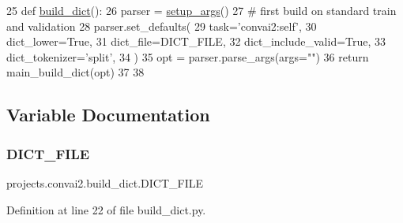 \begin{DoxyCode}
25 \textcolor{keyword}{def }\hyperlink{namespaceprojects_1_1convai2_1_1build__dict_a0e5fa5d8d2bd2bc934e287a49d2d60c7}{build\_dict}():
26     parser = \hyperlink{namespaceparlai_1_1scripts_1_1build__dict_a01e78707ace903aa772ada53fafe7067}{setup\_args}()
27     \textcolor{comment}{# first build on standard train and validation}
28     parser.set\_defaults(
29         task=\textcolor{stringliteral}{'convai2:self'},
30         dict\_lower=\textcolor{keyword}{True},
31         dict\_file=DICT\_FILE,
32         dict\_include\_valid=\textcolor{keyword}{True},
33         dict\_tokenizer=\textcolor{stringliteral}{'split'},
34     )
35     opt = parser.parse\_args(args=\textcolor{stringliteral}{""})
36     \textcolor{keywordflow}{return} main\_build\_dict(opt)
37 
38 
\end{DoxyCode}


\subsection{Variable Documentation}
\mbox{\label{namespaceprojects_1_1convai2_1_1build__dict_af45450500d405cd80212e1dbc72221e6}} 
\subsubsection{\texorpdfstring{D\+I\+C\+T\+\_\+\+F\+I\+LE}{DICT\_FILE}}
{\footnotesize\ttfamily projects.\+convai2.\+build\+\_\+dict.\+D\+I\+C\+T\+\_\+\+F\+I\+LE}



Definition at line 22 of file build\+\_\+dict.\+py.

